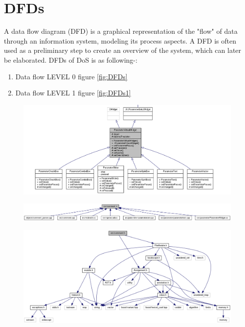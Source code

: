 \section{DFDs}
A data flow diagram (DFD) is a graphical representation of the "flow" of data through an information system, modeling its process aspects. A DFD is often used as a preliminary step to create an overview of the system, which can later be elaborated. DFDs of DoS is as following-:
\begin{enumerate}
\item Data flow LEVEL 0 figure \ref{fig:DFDs}
\item Data flow LEVEL 1 figure \ref{fig:DFDs1}
\end{enumerate}

\begin{figure}
\centering
\includegraphics[width=0.7\linewidth]{images/collaborative1}
\caption{}
\label{fig:collaborative1}
\end{figure}
\begin{figure}
\centering
\includegraphics[width=0.7\linewidth]{images/comment}
\caption{}
\label{fig:comment}
\end{figure}
\begin{figure}
\centering
\includegraphics[width=0.7\linewidth]{images/comment1}
\caption{}
\label{fig:comment1}
\end{figure}

